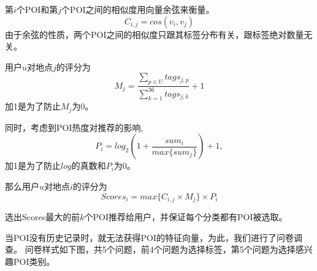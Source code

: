 \documentclass[UTF8]{article}
\begin{document}
第$i$个POI和第$j$个POI之间的相似度用向量余弦来衡量。
\[C_{i,j}=cos(v_i,v_j)\]
由于余弦的性质，两个POI之间的相似度只跟其标签分布有关，跟标签绝对数量无关。

用户$u$对地点$j$的评分为
\[M_j=\frac{\sum_{p \in U}tags_{j,p}}{\sum_{k=1}^{36}tags_{j,k}}+1\]
加1是为了防止$M_j$为0。

同时，考虑到POI热度对推荐的影响,
\[P_i=log_2(1+\frac{sum_i}{max\{sum_j\}})+1,\]
加1是为了防止$log$的真数和$P_i$为0。

那么用户$u$对地点$i$的评分为
\[Scores_i=max\{C_{i,j} \times M_j\} \times P_i\]

选出Scores最大的前$k$个POI推荐给用户，并保证每个分类都有POI被选取。

当POI没有历史记录时，就无法获得POI的特征向量，为此，我们进行了问卷调查。
问卷样式如下图，共5个问题，前4个问题为选择标签，第5个问题为选择感兴趣POI类别。
\end{document}
